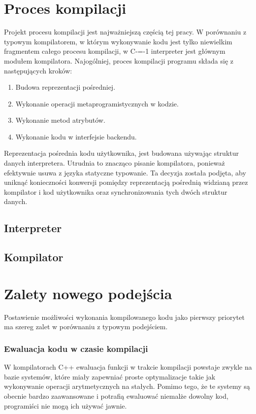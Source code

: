 \documentclass[conference]{IEEEtran}
\begin{document}
\section{Proces kompilacji}

Projekt procesu kompilacji jest najważniejszą częścią tej pracy.
W porównaniu z typowym kompilatorem, w którym wykonywanie kodu jest tylko niewielkim fragmentem całego procesu kompilacji, w C-=-1 interpreter jest głównym modułem kompilatora.
Najogólniej, proces kompilacji programu składa się z następujących kroków:
\begin{enumerate}
    \item Budowa reprezentacji pośredniej.
    \item Wykonanie operacji metaprogramistycznych w kodzie.
    \item Wykonanie metod atrybutów.
    \item Wykonanie kodu w interfejsie backendu.
\end{enumerate}

Reprezentacja pośrednia kodu użytkownika, jest budowana używając struktur danych interpretera.
Utrudnia to znacząco pisanie kompilatora, ponieważ efektywnie usuwa z języka statyczne typowanie.
Ta decyzja została podjęta, aby uniknąć konieczności konwersji pomiędzy reprezentacją pośrednią widzianą przez kompilator i kod użytkownika oraz synchronizowania tych dwóch struktur danych.


\subsection{Interpreter}
\subsection{Kompilator}
\section{Zalety nowego podejścia}

Postawienie możliwości wykonania kompilowanego kodu jako pierwszy priorytet ma szereg zalet w porównaniu z typowym podejściem.

\subsubsection{Ewaluacja kodu w czasie kompilacji}

W kompilatorach C++ ewaluacja funkcji w trakcie kompilacji powstaje zwykle na bazie systemów, które miały zapewniać proste optymalizacje takie jak wykonywanie operacji arytmetycznych na stałych.
Pomimo tego, że te systemy są obecnie bardzo zaawansowane i potrafią ewaluować niemalże dowolny kod, programiści nie mogą ich używać jawnie.
\end{document}
